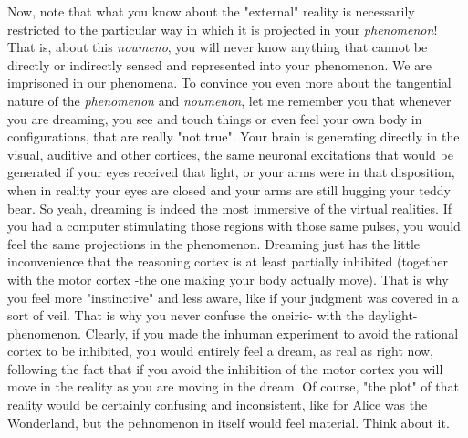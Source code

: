 \documentclass[11pt, a4paper]{article} %
\begin{document}
Now, note that what you know about the "external" reality is necessarily restricted to the particular way in which it is projected in your {\em phenomenon}! That is, about this {\em noumeno}, you will never know anything that cannot be directly or indirectly sensed and represented into your phenomenon. We are imprisoned in our phenomena. To convince you even more about the tangential nature of the {\em phenomenon} and {\em noumenon}, let me remember you that whenever you are dreaming, you see and touch things or even feel your own body in configurations, that are really "not true". Your brain is generating directly in the visual, auditive and other cortices, the same neuronal excitations that would be generated if your eyes received that light, or your arms were in that disposition, when in reality your eyes are closed and your arms are still hugging your teddy bear. So yeah, dreaming is indeed the most immersive of the virtual realities. If you had a computer stimulating those regions with those same pulses, you would feel the same projections in the phenomenon. Dreaming just has the little inconvenience that the reasoning cortex is at least partially inhibited (together with the motor cortex -the one making your body actually move). That is why you feel more "instinctive" and less aware, like if your judgment was covered in a sort of veil. That is why you never confuse the oneiric- with the daylight- phenomenon. Clearly, if you made the inhuman experiment to avoid the rational cortex to be inhibited, you would entirely feel a dream, as real as right now, following the fact that if you avoid the inhibition of the motor cortex you will move in the reality as you are moving in the dream. Of course, "the plot"  of that reality would be certainly confusing and inconsistent, like for Alice was the Wonderland, but the pehnomenon in itself would feel material. Think about it.\vspace{0.3cm}
\end{document}

